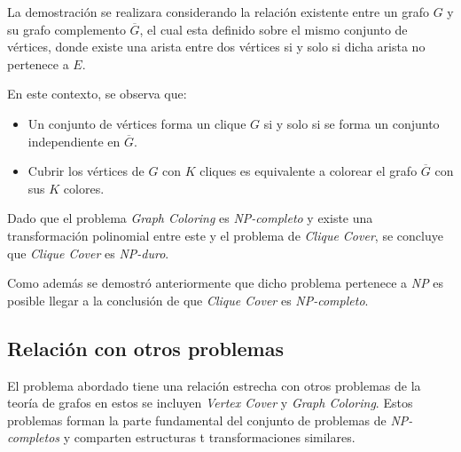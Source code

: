 La demostración se realizara considerando la relación existente entre un grafo $G$ y su grafo complemento $\overline{G}$, el cual esta definido sobre el mismo conjunto de vértices, donde existe una arista entre dos vértices si y solo si dicha arista no pertenece a $E$.

En este contexto, se observa que: 

\begin{itemize}
    \item Un conjunto de vértices forma un clique $G$ si y solo si se forma un conjunto independiente en $\overline{G}$.
    \item Cubrir los vértices de $G$ con $K$ cliques es equivalente a colorear el grafo $\overline{G}$ con sus $K$ colores.
\end{itemize}

Dado que el problema \textit{Graph Coloring} es \textit{NP-completo} y existe una transformación polinomial entre este y el problema de \textit{Clique Cover}, se concluye que \textit{Clique Cover} es \textit{NP-duro}.

Como además se demostró anteriormente que dicho problema pertenece a \textit{NP} es posible llegar a la conclusión de que \textit{Clique Cover} es \textit{NP-completo}.


\subsection{Relación con otros problemas}

El problema abordado tiene una relación estrecha con otros problemas de la teoría de grafos en estos se incluyen \textit{Vertex Cover} y \textit{Graph Coloring}. Estos problemas forman la parte fundamental del conjunto de problemas de \textit{NP-completos} y comparten estructuras t transformaciones similares.  

